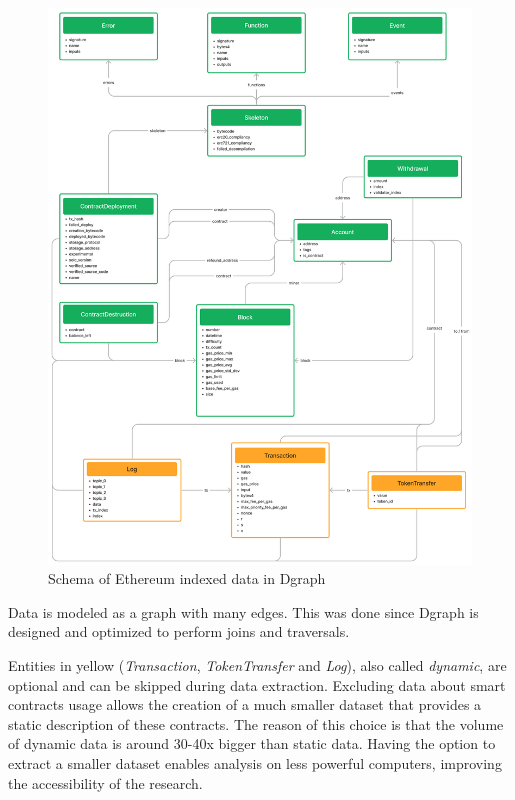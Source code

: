 
\begin{figure}[H]
  \centering
  \includegraphics[width=1\textwidth]{Figures/methods/schema.png}
  \caption[Schema of Ethereum indexed data in Dgraph]{Schema of Ethereum indexed data in Dgraph}
  \label{fig:schema}
\end{figure}

Data is modeled as a graph with many edges. This was done since Dgraph is designed and optimized to perform joins and traversals.

Entities in yellow (\textit{Transaction}, \textit{TokenTransfer} and \textit{Log}), also called \textit{dynamic}, are optional and can be skipped during data extraction. Excluding data about smart contracts usage allows the creation of a much smaller dataset that provides a static description of these contracts. The reason of this choice is that the volume of dynamic data is around 30-40x bigger than static data. Having the option to extract a smaller dataset enables analysis on less powerful computers, improving the accessibility of the research. \\

